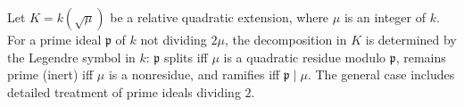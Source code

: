 Let $K = k(\sqrt{\mu})$ be a relative quadratic extension, where $\mu$ is an integer of $k$. For a prime ideal $\mathfrak{p}$ of $k$ not dividing $2\mu$, the decomposition in $K$ is determined by the Legendre symbol in $k$: $\mathfrak{p}$ splits iff $\mu$ is a quadratic residue modulo $\mathfrak{p}$, remains prime (inert) iff $\mu$ is a nonresidue, and ramifies iff $\mathfrak{p} \mid \mu$. The general case includes detailed treatment of prime ideals dividing $2$.
